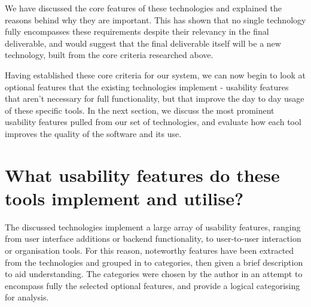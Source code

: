We have discussed the core features of these technologies and explained the reasons behind why they are important. This has shown that no single technology fully encompasses these requirements despite their relevancy in the final deliverable, and would suggest that the final deliverable itself will be a new technology, built from the core criteria researched above.

Having established these core criteria for our system, we can now begin to look at optional features that the existing technologies implement - usability features that aren't necessary for full functionality, but that improve the day to day usage of these specific tools. In the next section, we discuss the most prominent usability features pulled from our set of technologies, and evaluate how each tool improves the quality of the software and its use.

\section{What usability features do these tools implement and utilise?}
The discussed technologies implement a large array of usability features, ranging from user interface additions or backend functionality, to user-to-user interaction or organisation tools. For this reason, noteworthy features have been extracted from the technologies and grouped in to categories, then given a brief description to aid understanding. The categories were chosen by the author in an attempt to encompass fully the selected optional features, and provide a logical categorising for analysis.

